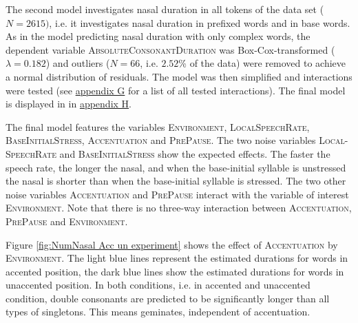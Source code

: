 The second model investigates nasal duration in all tokens of the data set ($N=2615)$, i.e. it investigates nasal duration in prefixed words and in base words. 
As in the model predicting nasal duration with only complex words, the dependent variable \textsc{AbsoluteConsonantDuration} was Box-Cox-transformed ($\lambda= 0.182$) and outliers ($N=66$, i.e. $ 2.52$\% of the data) were removed to achieve a normal distribution of residuals. The model was then simplified and interactions were tested (see \hyperref[Appendix G Summaries of tested interactions in experimental study]{appendix G} for a list of all tested interactions). The final model is displayed in  in \hyperref[Appendix H: Model Summaries Experiment]{appendix H}.


The final model features the variables \textsc{Environment}, \textsc{LocalSpeechRate}, \textsc{BaseInitialStress}, \textsc{Accentuation} and \textsc{PrePause}.
The two noise variables \textsc{Local-SpeechRate} and \textsc{BaseInitialStress} show the expected effects. The faster the speech rate, the longer the nasal, and when the base-initial syllable is unstressed the nasal is shorter than when the base-initial syllable is stressed.
The two other noise variables \textsc{Accentuation} and \textsc{PrePause} interact with the variable of interest \textsc{Environment}. Note that there is no three-way interaction between  \textsc{Accentuation}, \textsc{PrePause} and \textsc{Environment}.

Figure \ref{fig:NumNasal Acc un experiment} shows the effect of \textsc{Accentuation} by \textsc{Environment}. The light blue lines represent the estimated durations for words  in accented position, the dark blue lines show the estimated durations for words in unaccented position. In both conditions, i.e. in accented and unaccented condition, double consonants are predicted to be significantly longer than all types of singletons. This means  geminates, independent of accentuation.

